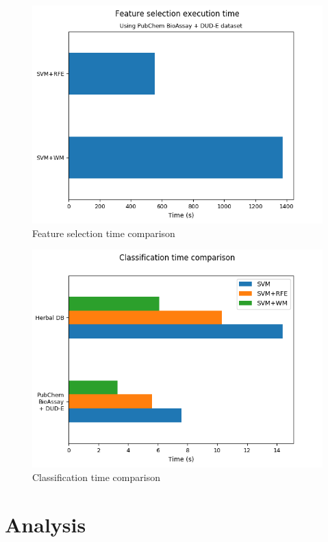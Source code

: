 \documentclass[conference,compsoc,12pt]{IEEEtran}
\begin{document}
\begin{figure}
	\includegraphics[scale=0.5]{../images/feature_selection_time_comparison.png}
	\caption{Feature selection time comparison}
	\label{fig_feature_selection_time_comparison}
\end{figure}

\begin{figure}
	\includegraphics[scale=0.5]{../images/classification_time_comparison.png}
	\caption{Classification time comparison}
	\label{fig_classification_time_comparison}
\end{figure}

\section{Analysis}
\end{document}
